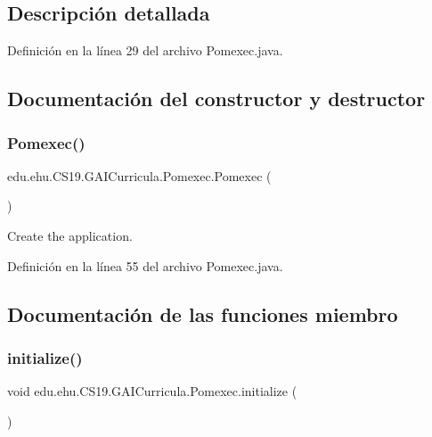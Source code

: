 \subsection{Descripción detallada}


Definición en la línea 29 del archivo Pomexec.\+java.



\subsection{Documentación del constructor y destructor}
\mbox{\label{a00029_a8de2bd06d0893d4f24ef2bd8216467cf}} 
\subsubsection{\texorpdfstring{Pomexec()}{Pomexec()}}
{\footnotesize\ttfamily edu.\+ehu.\+C\+S19.\+G\+A\+I\+Curricula.\+Pomexec.\+Pomexec (\begin{DoxyParamCaption}{ }\end{DoxyParamCaption})}



Create the application. 



Definición en la línea 55 del archivo Pomexec.\+java.



\subsection{Documentación de las funciones miembro}
\mbox{\label{a00029_ab89003495509c2f11da18c9675828571}} 
\subsubsection{\texorpdfstring{initialize()}{initialize()}}
{\footnotesize\ttfamily void edu.\+ehu.\+C\+S19.\+G\+A\+I\+Curricula.\+Pomexec.\+initialize (\begin{DoxyParamCaption}{ }\end{DoxyParamCaption})\hspace{0.3cm}{\ttfamily [private]}}



